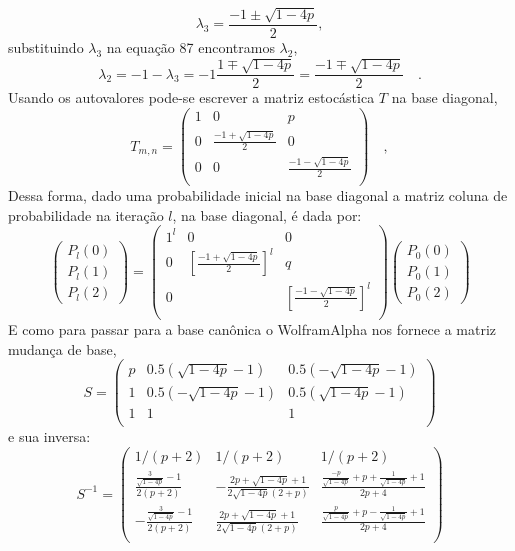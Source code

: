 \documentclass[12pt]{article}
\begin{document}
\begin{equation}
\lambda_3 = \frac{-1 \pm \sqrt{1 - 4p}}{2},
\end{equation}
substituindo $\lambda_3$ na equação 87 encontramos $\lambda_2$, 
\begin{equation}
\lambda_2 = -1 - \lambda_3 = -1 \frac{1\mp \sqrt{1 - 4p}}{2} = \frac{-1\mp\sqrt{1-4p}}{2} \quad.
\end{equation}
Usando os autovalores pode-se escrever a matriz estocástica $T$ na base diagonal,
\begin{equation}
T_{m,n} = 
 \begin{pmatrix}
  1 & 0 & p \\
  0 & \frac{-1+\sqrt{1-4p}}{2} & 0 \\
  0 & 0 & \frac{-1-\sqrt{1-4p}}{2} \\
 \end{pmatrix} \quad,
\end{equation}
Dessa forma, dado uma probabilidade inicial na base diagonal a matriz coluna de probabilidade na iteração $l$, na base diagonal, é dada por:
\begin{equation}
\begin{pmatrix}
P_l(0) \\
P_l(1) \\
P_l(2)
\end{pmatrix} = 
 \begin{pmatrix}
  1^l & 0 & 0 \\
  0 & \left[\frac{-1+\sqrt{1-4p}}{2}\right]^l & q \\
  0 &  & \left[\frac{-1-\sqrt{1-4p}}{2}\right]^l \\
 \end{pmatrix}
\begin{pmatrix}
P_0(0) \\
P_0(1) \\
P_0(2)
\end{pmatrix}
\end{equation}
E como para passar para a base canônica o WolframAlpha nos fornece a matriz mudança de base,
\begin{equation} 
S = 
 \begin{pmatrix}
  p & 0.5(\sqrt{1-4p}-1) & 0.5(-\sqrt{1-4p}-1) \\
  1 & 0.5(-\sqrt{1-4p}-1) & 0.5(\sqrt{1-4p}-1) \\
  1 & 1 & 1 \\
 \end{pmatrix}
\end{equation}
e sua inversa:
\begin{equation} 
S^{-1} = 
 \begin{pmatrix}
  1/(p+2) & 1/(p+2) & 1/(p+2) \\
  \frac{\frac{3}{\sqrt{1-4p}}-1}{2(p+2)} & -\frac{2p+\sqrt{1-4p}+1}{2\sqrt{1-4p}(2+p)} & \frac{\frac{-p}{\sqrt{1-4p}} + p + \frac{1}{\sqrt{1-4p}}+1} {2p+4} \\
  -\frac{\frac{3}{\sqrt{1-4p}}-1}{2(p+2)} & \frac{2p+\sqrt{1-4p}+1}{2\sqrt{1-4p}(2+p)} & \frac{\frac{p}{\sqrt{1-4p}} + p - \frac{1}{\sqrt{1-4p}}+1} {2p+4} \\
 \end{pmatrix}
\end{equation}
\end{document}
